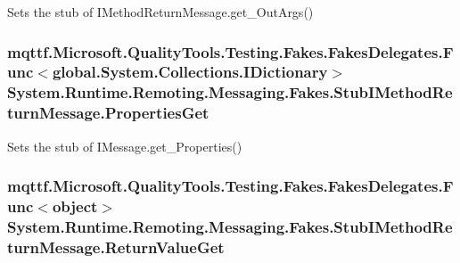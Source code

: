 Sets the stub of I\-Method\-Return\-Message.\-get\-\_\-\-Out\-Args()

\hypertarget{class_system_1_1_runtime_1_1_remoting_1_1_messaging_1_1_fakes_1_1_stub_i_method_return_message_a746fbb538730cacb9c61c69e68f1c40d}{
\subsubsection[{Properties\-Get}]{\setlength{\rightskip}{0pt plus 5cm}mqttf.\-Microsoft.\-Quality\-Tools.\-Testing.\-Fakes.\-Fakes\-Delegates.\-Func$<$global.\-System.\-Collections.\-I\-Dictionary$>$ System.\-Runtime.\-Remoting.\-Messaging.\-Fakes.\-Stub\-I\-Method\-Return\-Message.\-Properties\-Get}}\label{class_system_1_1_runtime_1_1_remoting_1_1_messaging_1_1_fakes_1_1_stub_i_method_return_message_a746fbb538730cacb9c61c69e68f1c40d}


Sets the stub of I\-Message.\-get\-\_\-\-Properties()

\hypertarget{class_system_1_1_runtime_1_1_remoting_1_1_messaging_1_1_fakes_1_1_stub_i_method_return_message_a2931a10fcdf0e5be60eb97464ba2038e}{
\subsubsection[{Return\-Value\-Get}]{\setlength{\rightskip}{0pt plus 5cm}mqttf.\-Microsoft.\-Quality\-Tools.\-Testing.\-Fakes.\-Fakes\-Delegates.\-Func$<$object$>$ System.\-Runtime.\-Remoting.\-Messaging.\-Fakes.\-Stub\-I\-Method\-Return\-Message.\-Return\-Value\-Get}}\label{class_system_1_1_runtime_1_1_remoting_1_1_messaging_1_1_fakes_1_1_stub_i_method_return_message_a2931a10fcdf0e5be60eb97464ba2038e}


